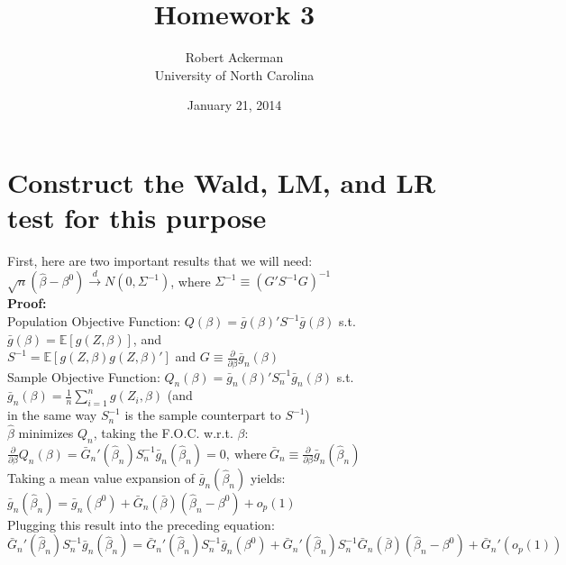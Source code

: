 \documentclass[11pt]{article}
\title{Homework 3}
\author{Robert Ackerman \\ University of North Carolina}
\date{January 21, 2014}							%
\theoremstyle{definition}
\newcommand*\circled[1]{\tikz[baseline=(char.base)]{
            \node[shape=circle,draw,inner sep=2pt] (char) {#1};}}
\def\indist{\stackrel{d}{\rightarrow}}
\begin{document}
\maketitle
\section{Construct the Wald, LM, and LR test for this purpose}
First, here are two important results that we will need: \\

\noindent
\circled{A} $\sqrt{n}(\hat{\beta}-\beta^{0}) \indist N(0,\Sigma^{-1})$, where $ \Sigma^{-1} \equiv (G'S^{-1}G)^{-1}$ \\ 

\textbf{Proof:}\\ 

Population Objective Function: $Q(\beta)=\bar{g}(\beta)'S^{-1}\bar{g}(\beta)$ s.t. $\bar{g}(\beta)=\mathbb{E}[g(Z,\beta)]$, and \\
\indent
$S^{-1}=\mathbb{E}[g(Z,\beta)g(Z,\beta)']$ and $G\equiv \frac{\partial}{\partial \beta}\bar{g}_{n}(\beta)$ \\

Sample Objective Function: $Q_{n}(\beta)=\bar{g}_{n}(\beta)'S_{n}^{-1}\bar{g}_{n}(\beta)$ s.t. $\bar{g}_{n}(\beta)=\frac{1}{n}\sum_{i=1}^{n}g(Z_{i},\beta)$ (and \\
\indent
in the same way $S_{n}^{-1}$ is the sample counterpart to $S^{-1}$)\\

$\hat{\beta}$ minimizes $Q_{n}$, taking the F.O.C. w.r.t. $\beta$: \\

$\frac{\partial}{\partial \beta}Q_{n}(\beta)=\bar{G}_{n}'(\hat{\beta}_{n})S_{n}^{-1}\bar{g}_{n}(\hat{\beta}_{n})=0, \ \text{where} \ \bar{G}_{n} \equiv \frac{\partial}{\partial \beta}\bar{g}_{n}(\hat{\beta}_{n})$ \\

Taking a mean value expansion of $\bar{g}_{n}(\hat{\beta}_{n})$ yields: \\

$\bar{g}_{n}(\hat{\beta}_{n})=\bar{g}_{n}(\beta^{0})+\bar{G}_{n}(\bar{\beta})(\hat{\beta}_{n}-\beta^{0})+o_{p}(1)$ \\

Plugging this result into the preceding equation: \\

$\bar{G}_{n}'(\hat{\beta}_{n})S_{n}^{-1}\bar{g}_{n}(\hat{\beta}_{n})=\bar{G}_{n}'(\hat{\beta}_{n})S_{n}^{-1}\bar{g}_{n}(\beta^{0})+\bar{G}_{n}'(\hat{\beta}_{n})S_{n}^{-1}\bar{G}_{n}(\bar{\beta})(\hat{\beta}_{n}-\beta^{0})+ \bar{G}_{n}'(o_{p}(1)) $ \\
\end{document}
